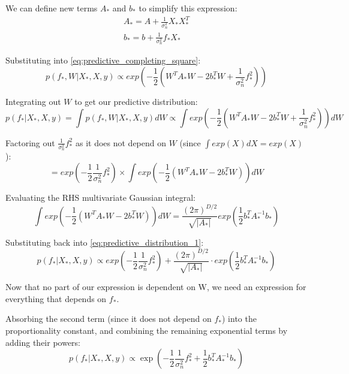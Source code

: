 We can define new terms $A_*$ and $b_*$ to simplify this expression:
\begin{equation*}
    \begin{aligned}
        A_* = A + \frac{1}{\sigma^2_n}X_*X_*^T \\
        b_* = b + \frac{1}{\sigma^2_n}f_*X_*
    \end{aligned}
\end{equation*}

Substituting into \ref{eq:predictive_completing_square}:
\begin{equation*}
    p(f_*,W|X_*,X,y) \propto exp\left(-\frac{1}{2}\left(W^TA_*W - 2b_*^TW + \frac{1}{\sigma_n^2}f_*^2\right)\right)
\end{equation*}

Integrating out $W$ to get our predictive distribution:
\begin{equation} \label{eq:predictive_distribution_1}
    p(f_*|X_*,X,y) = \int p(f_*,W|X_*,X,y)dW \propto \int exp\left(-\frac{1}{2}\left(W^TA_*W - 2b_*^TW + \frac{1}{\sigma_n^2}f_*^2\right)\right)dW
\end{equation}

Factoring out $\frac{1}{\sigma_n^2}f_*^2$ as it does not depend on $W$ (since $\int exp(X) dX = exp(X)$):
\begin{equation*}
    = exp\left(-\frac{1}{2}\frac{1}{\sigma_n^2}f_*^2\right) \times \int exp\left(-\frac{1}{2}\left(W^TA_*W - 2b_*^TW\right)\right) dW
\end{equation*}

Evaluating the RHS multivariate Gaussian integral:
\begin{equation*}
    \int exp\left(-\frac{1}{2} \left( W^TA_*W - 2b_*^TW \right) \right) dW = \frac{(2\pi)^{D/2}} {\sqrt{|A_*|}} exp\left( \frac{1}{2} b_*^TA_*^{-1}b_* \right)
\end{equation*}

Substituting back into \ref{eq:predictive_distribution_1}: 
\begin{equation*}
    p(f_*|X_*,X,y) \propto exp\left(-\frac{1}{2}\frac{1}{\sigma_n^2}f_*^2\right) + \frac{(2\pi)^{D/2}}{\sqrt{|A_*|}} \cdot exp\left(\frac{1}{2}b_*^TA_*^{-1}b_*\right)  
\end{equation*}
    
Now that no part of our expression is dependent on W, we need an expression for everything that depends on $f_*$. 

Absorbing the second term (since it does not depend on $f_*$) into the proportionality constant, and combining the remaining exponential terms by adding their powers:
\begin{equation*}
    p(f_*|X_*,X,y) \propto \exp\left(-\frac{1}{2}\frac{1}{\sigma_n^2}f_*^2 + \frac{1}{2}b_*^TA_*^{-1}b_*\right)
\end{equation*}

